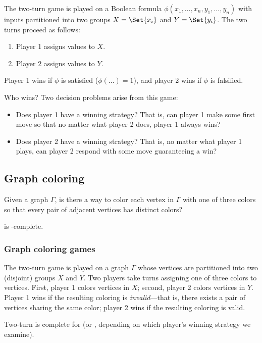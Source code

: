 \begin{definition}%
  The two-turn \SAT{} game is played on a Boolean formula \(\phi(x_1, \dots,
  x_n, y_1, \dots, y_n)\) with inputs partitioned into two groups \(X =
  \Set{x_i}\) and \(Y = \Set{y_i}\).  The two turns proceed as follows:
  \begin{enumerate}
    \item Player 1 assigns values to \(X\).
    \item Player 2 assigns values to \(Y\).
  \end{enumerate}
  Player 1 wins if \(\phi\) is satisfied (\(\phi(\dots) = 1\)), and player 2
  wins if \(\phi\) is falsified.

  Who wins?  Two decision problems arise from this game:
  \begin{itemize}
    \item Does player 1 have a winning strategy?  That is, can player 1 make
      some first move so that no matter what player 2 does, player 1 always
      wins?

    \item Does player 2 have a winning strategy?  That is, no matter what
      player 1 plays, can player 2 respond with some move guaranteeing a win?
  \end{itemize}

\end{definition}


\subsection{Graph coloring}

\begin{definition}%
  Given a graph \(\Gamma\), is there a way to color each vertex in  \(\Gamma\)
  with one of three colors so that every pair of adjacent vertices has distinct
  colors?
\end{definition}

\begin{theorem}
   is \NP-complete.
\end{theorem}

\subsubsection{Graph coloring games}

\begin{definition}%
  The two-turn  game is played on a graph \(\Gamma\) whose
  vertices are partitioned into two (disjoint) groups \(X\) and \(Y\).  Two
  players take turns assigning one of three colors to vertices.  First, player
  1 colors vertices in \(X\); second, player 2 colors  vertices in \(Y\).
  Player 1 wins if the resulting coloring is \emph{invalid}---that is, there
  exists a pair of vertices sharing the same color; player 2 wins if the
  resulting coloring is valid.

\end{definition}

\begin{conjecture}
  Two-turn  is complete for  (or , depending on
  which player's winning strategy we examine).
\end{conjecture}
